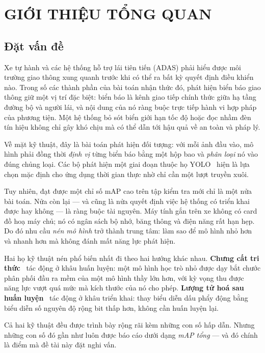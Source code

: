 \chapter{GIỚI THIỆU TỔNG QUAN}
\label{ch:gioi_thieu}

\section{Đặt vấn đề}

Xe tự hành và các hệ thống hỗ trợ lái tiên tiến (ADAS) phải hiểu được môi trường giao thông xung
quanh trước khi có thể ra bất kỳ quyết định điều khiển nào. Trong số các thành phần của bài toán
nhận thức đó, phát hiện biển báo giao thông giữ một vị trí đặc biệt: biển báo là kênh giao tiếp
chính thức giữa hạ tầng đường bộ và người lái, và nội dung của nó ràng buộc trực tiếp hành vi hợp
pháp của phương tiện. Một hệ thống bỏ sót biển giới hạn tốc độ hoặc đọc nhầm đèn tín hiệu không chỉ
gây khó chịu mà có thể dẫn tới hậu quả về an toàn và pháp lý.

Về mặt kỹ thuật, đây là bài toán phát hiện đối tượng: với mỗi ảnh đầu vào, mô hình phải đồng thời
\emph{định vị} từng biển báo bằng một hộp bao và \emph{phân loại} nó vào đúng chủng loại. Các bộ
phát hiện một giai đoạn thuộc họ YOLO~\cite{redmon2016yolo,jocher2023ultralytics} hiện là lựa chọn
mặc định cho ứng dụng thời gian thực nhờ chỉ cần một lượt truyền xuôi.

Tuy nhiên, đạt được một chỉ số mAP cao trên tập kiểm tra mới chỉ là một nửa bài toán. Nửa còn lại
--- và cũng là nửa quyết định việc hệ thống có triển khai được hay không --- là ràng buộc tài
nguyên. Máy tính gắn trên xe không có card đồ hoạ máy chủ; nó có ngân sách bộ nhớ, băng thông và
điện năng rất hạn hẹp. Do đó nhu cầu \emph{nén mô hình} trở thành trung tâm: làm sao để mô hình nhỏ
hơn và nhanh hơn mà không đánh mất năng lực phát hiện.

Hai họ kỹ thuật nén phổ biến nhất đi theo hai hướng khác nhau. \textbf{Chưng cất tri
thức}~\cite{hinton2015distillation} tác động ở khâu huấn luyện: một mô hình học trò nhỏ được dạy
bắt chước phân phối đầu ra mềm của một mô hình thầy lớn hơn, với kỳ vọng thu được năng lực vượt quá
mức mà kích thước của nó cho phép. \textbf{Lượng tử hoá sau huấn
luyện}~\cite{jacob2018quantization} tác động ở khâu triển khai: thay biểu diễn dấu phẩy động bằng
biểu diễn số nguyên độ rộng bit thấp hơn, không cần huấn luyện lại.

Cả hai kỹ thuật đều được trình bày rộng rãi kèm những con số hấp dẫn. Nhưng những con số đó gần như
luôn được báo cáo dưới dạng \emph{mAP tổng} --- và đó chính là điểm mà đề tài này đặt nghi vấn.

